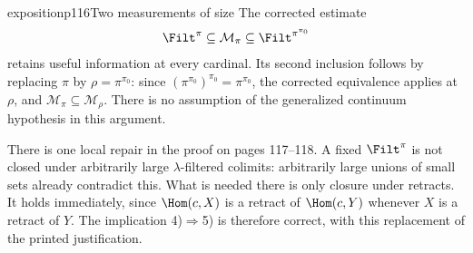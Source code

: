 \begin{dcomment}{exposition}{p116}{Two measurements of size}
The corrected estimate
\[
 \Filt^\pi\subseteq\mathcal M_\pi
       \subseteq\Filt^{\pi^{\pi_0}}
\]
retains useful information at every cardinal. Its second inclusion follows by replacing $\pi$ by $\rho=\pi^{\pi_0}$: since $(\pi^{\pi_0})^{\pi_0}=\pi^{\pi_0}$, the corrected equivalence applies at $\rho$, and $\mathcal M_\pi\subseteq\mathcal M_\rho$. There is no assumption of the generalized continuum hypothesis in this argument.

There is one local repair in the proof on pages 117--118. A fixed $\Filt^\pi$ is not closed under arbitrarily large $\lambda$-filtered colimits: arbitrarily large unions of small sets already contradict this. What is needed there is only closure under retracts. It holds immediately, since $\Hom(c,X)$ is a retract of $\Hom(c,Y)$ whenever $X$ is a retract of $Y$. The implication 4)$\Rightarrow$5) is therefore correct, with this replacement of the printed justification.
\end{dcomment}

